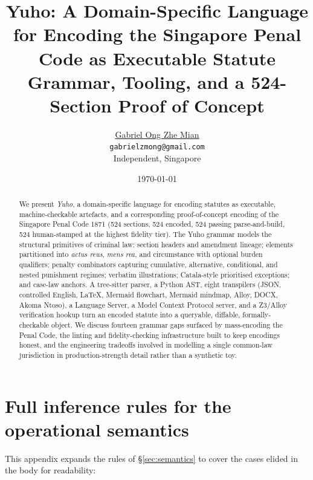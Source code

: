 \documentclass[10pt,a4paper,twocolumn]{article}
\title{Yuho: A Domain-Specific Language for Encoding the Singapore Penal Code as Executable Statute\\
\large Grammar, Tooling, and a 524-Section Proof of Concept}
\author{\href{https://gabrielongzm.com}{Gabriel Ong Zhe Mian}\\\texttt{gabrielzmong@gmail.com}\\Independent, Singapore}
\date{\today}
\newcommand{\statRawSections}{524}%
\newcommand{\statEncoded}{524}%
\newcommand{\statLOnePass}{524}%
\newcommand{\statLThreePass}{524}%
\begin{document}
\maketitle

\begin{abstract}
We present \emph{Yuho}, a domain-specific language for encoding statutes
as executable, machine-checkable artefacts, and a corresponding
proof-of-concept encoding of the Singapore Penal Code 1871
(\statRawSections{} sections, \statEncoded{} encoded, \statLOnePass{}
passing parse-and-build, \statLThreePass{} human-stamped at the highest
fidelity tier). The Yuho grammar models the structural primitives of
criminal law: section headers and amendment lineage; elements partitioned
into \emph{actus reus}, \emph{mens rea}, and circumstance with optional
burden qualifiers; penalty combinators capturing cumulative, alternative,
conditional, and nested punishment regimes; verbatim illustrations;
Catala-style prioritised exceptions; and case-law anchors. A tree-sitter
parser, a Python AST, eight transpilers (JSON, controlled English,
\LaTeX{}, Mermaid flowchart, Mermaid mindmap, Alloy, DOCX, Akoma Ntoso), a Language Server, a Model Context
Protocol server, and a Z3/Alloy verification hookup turn an encoded
statute into a queryable, diffable, formally-checkable object. We
discuss fourteen grammar gaps surfaced by mass-encoding the Penal Code,
the linting and fidelity-checking infrastructure built to keep encodings
honest, and the engineering tradeoffs involved in modelling a single
common-law jurisdiction in production-strength detail rather than a
synthetic toy.
\end{abstract}
















\appendix
\section{Full inference rules for the operational semantics}
\label{app:semantics-full}

This appendix expands the rules of \S\ref{sec:semantics} to cover
the cases elided in the body for readability:
\end{document}
